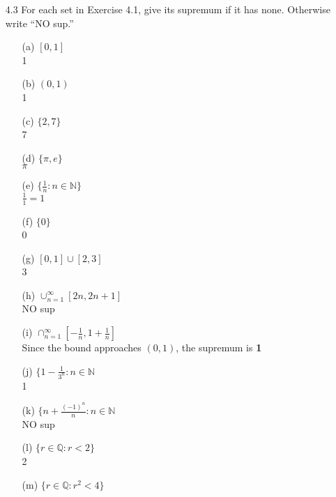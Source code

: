 
\usepackage{amsmath, dsfont}

\oddsidemargin 0in
\evensidemargin 0in
\textwidth 6.5in
\topmargin -0.5in
\textheight 9.0in
\newcommand{\norm}[1]{\left\lVert #1 \right\rVert}
\newcommand{\abs}[1]{\left\vert #1 \right\vert}
\newcommand{\?}{\stackrel{?}{=}}



\pagestyle{myheadings}

\begin{itemize}
  \item [4.3] For each set in Exercise 4.1, give its supremum if it has none. Otherwise write ``NO sup.''
    \begin{itemize}
      \item [(a)] $[0,1]$\\
        1
      \item [(b)] $(0,1)$\\
        1
      \item [(c)]  $\{2, 7\}$\\
        7
      \item [(d)]  $\{\pi, e\}$\\
        $\pi$
      \item [(e)]  $\{\frac{1}{n} : n \in \mathds{N}\}$\\
        $\frac{1}{1} = 1$
      \item [(f)]  $\{0\}$\\
        0
      \item [(g)] $[0,1] \cup [2,3]$\\
        3
      \item [(h)] $\cup_{n=1}^\infty [2n, 2n+1]$\\
        NO sup
      \item [(i)] $\cap_{n=1}^\infty [-\frac{1}{n}, 1 + \frac{1}{n}]$\\
        Since the bound approaches $(0,1)$, the supremum is \textbf{1}       
      \item [(j)] $\{1 - \frac{1}{3^n} : n \in \mathds{N}$\\
        1
      \item [(k)] $\{n + \frac{(-1)^n}{n} : n \in \mathds{N}$\\
        NO sup
      \item [(l)] $\{r \in \mathds{Q} : r < 2\}$\\
        2
      \item [(m)] $\{r \in \mathds{Q} : r^2 < 4\}$\\

\end{itemize}
\end{itemize}
